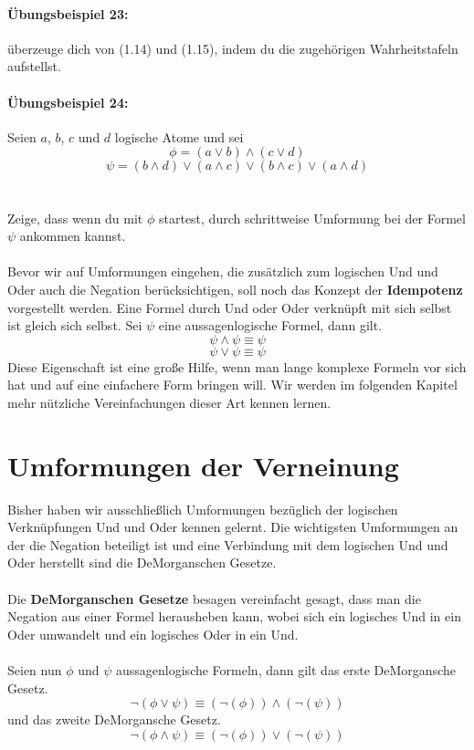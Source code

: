 \documentclass[11pt,a4paper,leqno]{report}
\numberwithin{equation}{chapter}
\begin{document}
\paragraph{\"Ubungsbeispiel 23:} \"uberzeuge dich von (1.14) und (1.15), indem du die zugeh\"origen Wahrheitstafeln aufstellst.
\paragraph{\"Ubungsbeispiel 24:} Seien $a$, $b$, $c$ und $d$ logische Atome und sei 
$$\phi = (a\vee b)\wedge(c\vee d)$$
$$\psi = (b\wedge d)\vee(a\wedge c)\vee(b\wedge c)\vee(a\wedge d)$$
\\
\\
Zeige, dass wenn du mit $\phi$ startest, durch schrittweise Umformung bei der Formel $\psi$ ankommen kannst.\\
\\
Bevor wir auf Umformungen eingehen, die zus\"atzlich zum logischen Und und Oder auch die Negation ber\"ucksichtigen, soll noch das Konzept der \textbf{Idempotenz} vorgestellt werden. Eine Formel durch Und oder Oder verkn\"upft mit sich selbst ist gleich sich selbst. Sei $\psi$ eine aussagenlogische Formel, dann gilt.
\begin{equation}
	\psi\wedge\psi\equiv\psi
\end{equation}
\begin{equation}
\psi\vee\psi\equiv\psi
\end{equation}
Diese Eigenschaft ist eine gro\ss{}e Hilfe, wenn man lange komplexe Formeln vor sich hat und auf eine einfachere Form bringen will. Wir werden im folgenden Kapitel mehr n\"utzliche Vereinfachungen dieser Art kennen lernen.
\section{Umformungen der Verneinung}
Bisher haben wir ausschlie\ss{}lich Umformungen bez\"uglich der logischen Verkn\"upfungen Und und Oder kennen gelernt. Die wichtigsten Umformungen an der die Negation beteiligt ist und eine Verbindung mit dem logischen Und und Oder herstellt sind die DeMorganschen Gesetze.\\
\\
Die \textbf{DeMorganschen Gesetze} besagen vereinfacht gesagt, dass man die Negation aus einer Formel herausheben kann, wobei sich ein logisches Und in ein Oder umwandelt und ein logisches Oder in ein Und.\\
\\
Seien nun $\phi$ und $\psi$ aussagenlogische Formeln, dann gilt das erste DeMorgansche Gesetz.
\begin{equation}
	\neg(\phi\vee\psi)\equiv(\neg(\phi))\wedge(\neg(\psi))
\end{equation}
und das zweite DeMorgansche Gesetz.
\begin{equation}
\neg(\phi\wedge\psi)\equiv(\neg(\phi))\vee(\neg(\psi))
\end{equation}
\end{document}
